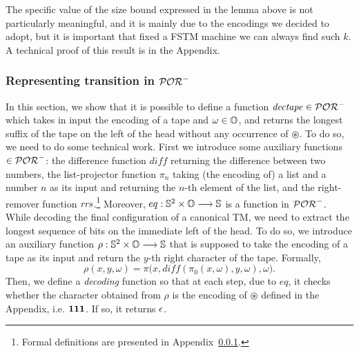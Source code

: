 The specific value of the size bound expressed in the lemma above
is not particularly meaningful, and it is
mainly due to the encodings we decided to adopt, but it is important that
fixed a FSTM machine we can always find such $k$.
A technical proof of this result is in the Appendix.








\subsubsection{Representing transition in $\mathcal{POR}^-$}

In this section, we show that it is possible to define a function
$\mathit{dectape} \in \mathcal{POR}^-$ which takes in input the encoding of a tape and
$\omega \in \mathbb{O}$, and returns the longest suffix of the tape on the left of the
head without any occurrence of $\circledast$. To do so, we need to do some
technical work. First we introduce
some auxiliary functions $\in \mathcal{POR}^-$:
the difference function $\mathit{diff}$ returning the difference
between two numbers,
the list-projector function $\pi_n$
taking (the encoding of) a list
and a number $n$ as its input and returning
the $n$-th element of the list,
and the right-remover function $\mathit{rrs}$.\footnote{Formal
definitions are presented in Appendix~\ref{}.}
Moreover, $eq: \mathbb{S}^2 \times \mathbb{O} \longrightarrow \mathbb{S}$
is a function in $\mathcal{POR}^-$.
%
%
%
%
%
%
While decoding the final configuration of a
canonical TM,
we need to extract the longest
sequence of bits on the immediate
left of the head.
%
To do so, we introduce an auxiliary
function $\rho:\mathbb{S}^2\times \mathbb{O} \longrightarrow \mathbb{S}$
that is supposed to take the encoding of a tape
as its input and return the $y$-th right character
of the tape.
Formally,
%
$$
\rho(x,y,\omega) = \pi\big(x,
diff(\pi_0(x,\omega), y,\omega),\omega\big).
$$
Then, we define a \emph{decoding}
function so that at each step,
due to $eq$,
it checks whether the character obtained from
$\rho$ is the encoding of $\circledast$ defined in the Appendix, i.e.
$\mathbf{1}\mathbf{1}\mathbf{1}$.
If so, it returns $\epsilon$.
%







